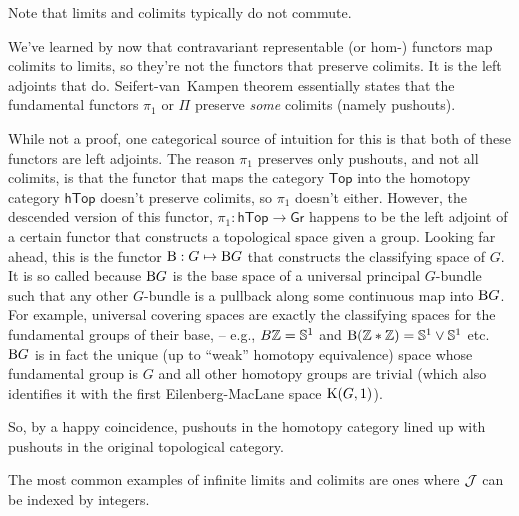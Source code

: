 Note that limits and colimits typically do not commute.

\begin{example}
    We've learned by now that contravariant representable (or hom-) functors map colimits to limits, so they're not the functors that preserve colimits. It is the left adjoints that do. Seifert-van~Kampen theorem essentially states that the fundamental functors $\pi_1$ or $\Pi$ preserve \emph{some} colimits (namely pushouts). 
    
    While not a proof, one categorical source of intuition for this is that both of these functors are left adjoints. The reason $\pi_1$ preserves only pushouts, and not all colimits, is that the functor that maps the category $\mathsf{Top}$ into the homotopy category $\mathsf{hTop}$ doesn't preserve colimits, so $\pi_1$ doesn't either. However, the descended version of this functor, $\pi_1:\mathsf{hTop}\to \mathsf{Gr}$ happens to be the left adjoint of a certain functor that constructs a topological space given a group. Looking far ahead, this is the functor $\mathrm{B}:G\mapsto \mathrm{B} G$ that constructs the classifying space of $G$. It is so called because $\mathrm{B} G$ is the base space of a universal principal $G$-bundle such that any other $G$-bundle is a pullback along some continuous map into $\mathrm{B} G$. For example, universal covering spaces are exactly the classifying spaces for the fundamental groups of their base, -- e.g., $B\mathbb{Z}=\mathbb{S}^1$ and $\mathrm{B}(\mathbb{Z}\ast \mathbb{Z})=\mathbb{S}^1\vee \mathbb{S}^1$ etc. $\mathrm{B} G$ is in fact the unique (up to ``weak'' homotopy equivalence) space whose fundamental group is $G$ and all other homotopy groups are trivial (which also identifies it with the first  Eilenberg-MacLane space $\mathrm{K}(G,1)$).

    So, by a happy coincidence, pushouts in the homotopy category lined up with pushouts in the original topological category.
\end{example}

The most common examples of infinite limits and colimits are ones where $\mathcal{J} $ can be indexed by integers.

